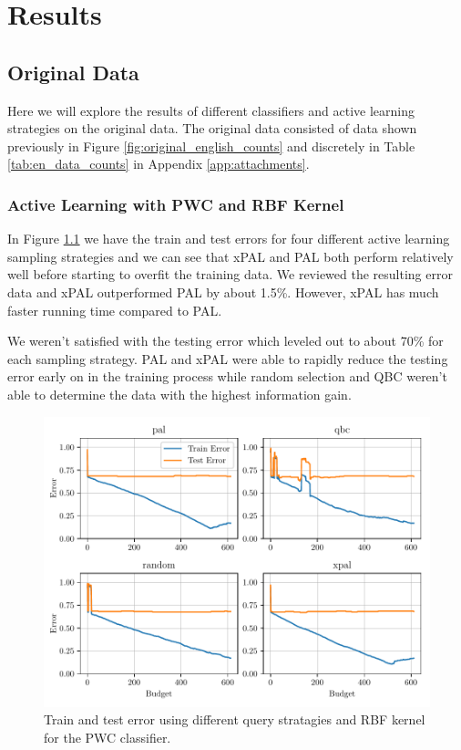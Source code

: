\chapter{Results}

\section{Original Data}

Here we will explore the results of different classifiers and active learning strategies on the original data. The original data consisted of data shown previously in Figure \ref{fig:original_english_counts} and discretely in Table \ref{tab:en_data_counts} in Appendix \ref{app:attachments}. 

\subsection{Active Learning with PWC and RBF Kernel}

In Figure \ref{fig:plot_all_results_rbf} we have the train and test errors for four different active learning sampling strategies and we can see that xPAL and PAL both perform relatively well before starting to overfit the training data. We reviewed the resulting error data and xPAL outperformed PAL by about 1.5\%. However, xPAL has much faster running time compared to PAL. 

We weren't satisfied with the testing error which leveled out to about 70\% for each sampling strategy. PAL and xPAL were able to rapidly reduce the testing error early on in the training process while random selection and QBC weren't able to determine the data with the highest information gain. 

\begin{figure}[ht]
  \centering
  \includegraphics[width=\textwidth]{../img/plot_all_results_rbf.pdf}
  \caption{Train and test error using different query stratagies and RBF kernel for the PWC classifier.}
  \label{fig:plot_all_results_rbf}
\end{figure}

